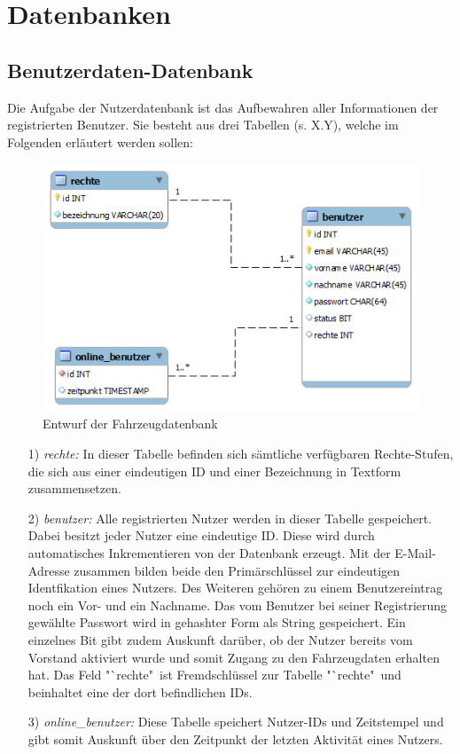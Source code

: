 \documentclass[fontsize = 12pt, paper = a4]{scrreprt}
\begin{document}
\section{Datenbanken}

\subsection{Benutzerdaten-Datenbank}

Die Aufgabe der Nutzerdatenbank ist das Aufbewahren aller Informationen der registrierten Benutzer. Sie besteht aus drei Tabellen (s. X.Y), welche im Folgenden erläutert werden sollen:

\begin{figure}[h]
\centering
\includegraphics[scale = 0.6]{nutzerdatenbank} 
\caption{Entwurf der Fahrzeugdatenbank}
\end{figure} 


\newpage


\begin{itemize}
\item[1)] \textit{rechte:} 
In dieser Tabelle befinden sich sämtliche verfügbaren Rechte-Stufen, die sich aus einer eindeutigen ID und einer Bezeichnung in Textform zusammensetzen.

\item[2)] \textit{benutzer:} 
Alle registrierten Nutzer werden in dieser Tabelle gespeichert. Dabei besitzt jeder Nutzer eine eindeutige ID. Diese wird durch automatisches Inkrementieren von der Datenbank erzeugt. Mit der E-Mail-Adresse zusammen bilden beide den Primärschlüssel zur eindeutigen Identfikation eines Nutzers. Des Weiteren gehören zu einem Benutzereintrag noch ein Vor- und ein Nachname. Das vom Benutzer bei seiner Registrierung gewählte Passwort wird in gehashter Form als String gespeichert. Ein einzelnes Bit gibt zudem Auskunft darüber, ob der Nutzer bereits vom Vorstand aktiviert wurde und somit Zugang zu den Fahrzeugdaten erhalten hat. Das Feld "`rechte"\ ist Fremdschlüssel zur Tabelle "`rechte"\ und beinhaltet eine der dort befindlichen IDs.

\item[3)] \textit{online\_benutzer:} 
Diese Tabelle speichert Nutzer-IDs und Zeitstempel und gibt somit Auskunft über den Zeitpunkt der letzten Aktivität eines Nutzers.

\end{itemize}
\end{document}
